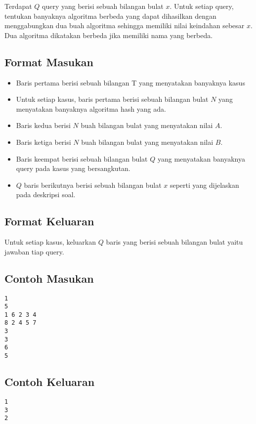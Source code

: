 \documentclass{article}
\begin{document}
\par Terdapat $Q$ query yang berisi sebuah bilangan bulat $x$. Untuk setiap query, tentukan banyaknya algoritma berbeda yang dapat dihasilkan dengan menggabungkan dua buah algoritma sehingga memiliki nilai keindahan sebesar $x$. Dua algoritma dikatakan berbeda jika memiliki nama yang berbeda.

\subsection*{Format Masukan}
\begin{itemize}
\item Baris pertama berisi sebuah bilangan T yang menyatakan banyaknya kasus
\item Untuk setiap kasus, baris pertama berisi sebuah bilangan bulat $N$ yang menyatakan banyaknya algoritma hash yang ada.
\item Baris kedua berisi $N$ buah bilangan bulat yang menyatakan nilai $A$.
\item Baris ketiga berisi $N$ buah bilangan bulat yang menyatakan nilai $B$.
\item Baris keempat berisi sebuah bilangan bulat $Q$ yang menyatakan banyaknya query pada kasus yang bersangkutan.
\item $Q$ baris berikutnya berisi sebuah bilangan bulat $x$ seperti yang dijelaskan pada deskripsi soal.
\end{itemize}
\subsection*{Format Keluaran}

\par Untuk setiap kasus, keluarkan $Q$ baris yang berisi sebuah bilangan bulat yaitu jawaban tiap query.

\subsection*{Contoh Masukan}

\begin{lstlisting}
1
5
1 6 2 3 4
8 2 4 5 7
3
3
6
5
\end{lstlisting}

\subsection*{Contoh Keluaran}

\begin{lstlisting}
1
3
2
\end{lstlisting}
\end{document}
